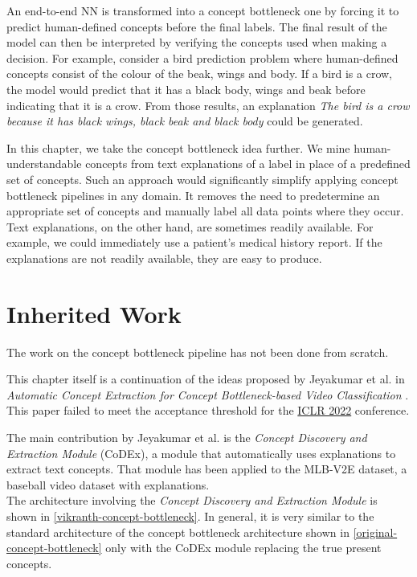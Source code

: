 An end-to-end NN is transformed into a concept bottleneck one by forcing it to predict human-defined concepts before the final labels.
The final result of the model can then be interpreted by verifying the concepts used when making a decision.
For example, consider a bird prediction problem where human-defined concepts consist of the colour of the beak, wings and body.
If a bird is a crow, the model would predict that it has a black body, wings and beak before indicating that it is a crow.
From those results, an explanation \emph{The bird is a crow because it has black wings, black beak and black body} could be generated.

In this chapter, we take the concept bottleneck idea further.
We mine human-understandable concepts from text explanations of a label in place of a predefined set of concepts.
Such an approach would significantly simplify applying concept bottleneck pipelines in any domain.
It removes the need to predetermine an appropriate set of concepts and manually label all data points where they occur.
Text explanations, on the other hand, are sometimes readily available. For example, we could immediately use a patient's medical history report.
If the explanations are not readily available, they are easy to produce.


\section{Inherited Work}
\label{inherited-work}

The work on the concept bottleneck pipeline has not been done from scratch.

This chapter itself is a continuation of the ideas proposed by Jeyakumar et al. in \emph{Automatic Concept Extraction for Concept Bottleneck-based Video Classification} \cite{RefWorks:RefID:16-2021automatic}. This paper failed to meet the acceptance threshold for the \href{https://iclr.cc/}{ICLR 2022} conference. 

The main contribution by Jeyakumar et al. is the \emph{Concept Discovery and Extraction Module} (CoDEx), a module that automatically uses explanations to extract text concepts.
That module has been applied to the MLB-V2E dataset, a baseball video dataset with explanations. \\
The architecture involving the \emph{Concept Discovery and Extraction Module} is shown in \ref{vikranth-concept-bottleneck}. 
In general, it is very similar to the standard architecture of the concept bottleneck architecture shown in \ref{original-concept-bottleneck} only with the CoDEx module replacing the true present concepts.

